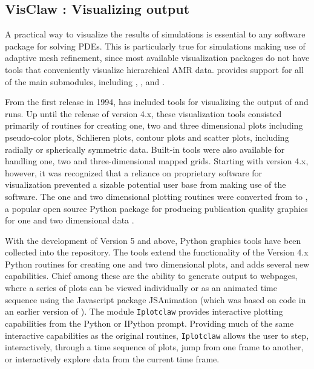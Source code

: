 %
%
%

\subsection{VisClaw : Visualizing \clawpack output}
A practical way to visualize the results of simulations is
essential to any software package for solving PDEs.
This is particularly true for simulations making use of adaptive mesh
refinement, since most available visualization packages do not
have tools that conveniently visualize hierarchical AMR data.  \visclaw provides 
support for all of the main \clawpack submodules, including
\classic, \amrclaw, \pyclaw and \geoclaw.

From the first release in 1994,
\clawpack has included tools for visualizing the output of \clawpack and
\amrclaw runs.  Up until the release of version \clawpack 4.x, these
visualization tools consisted primarily of \mlab routines
for creating one, two and three dimensional plots including
pseudo-color plots, Schlieren plots, contour plots and scatter plots,
including  radially or spherically symmetric data. 
Built-in tools were also available
for handling one, two and three-dimensional mapped grids.
Starting with version 4.x, however, it was recognized that a reliance
on proprietary software for visualization prevented a sizable
potential user base from making use of the \clawpack software.
The one and two dimensional plotting
routines were converted from \mlab to \mplotlib,
a popular open source
Python package for producing publication quality graphics
for one and two dimensional data \cite{Hunter:2007}.

With the development of \clawpack Version 5 and above, Python graphics tools
have been collected into the \visclaw repository.
The \visclaw tools extend the
functionality of the Version 4.x Python routines for creating one and
two dimensional plots, and adds several new capabilities.  Chief among
these are the ability to generate output to webpages,
where a series of plots can be viewed individually or as an animated
time sequence using the Javascript package {\sc JSAnimation}
\cite{jsanimation} (which was based on code in an earlier version of
\clawpack).
The \visclaw module {\tt Iplotclaw} provides
interactive plotting capabilities from the Python or IPython prompt.
Providing much of the same interactive capabilities as the original
\mlab routines, {\tt Iplotclaw} allows the user to step,
interactively, through a time sequence of plots, jump from one frame
to another, or interactively explore data from the current time frame.


